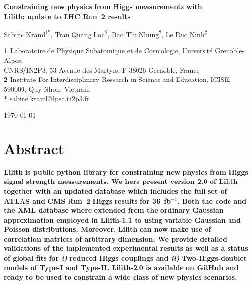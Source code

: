 \documentclass[submission, Phys]{SciPost}
\begin{document}
\begin{center}{\Large \textbf{
  Constraining new physics from Higgs measurements with\\[1mm] Lilith: update to LHC Run~2 results}}\end{center}

\begin{center}
Sabine Kraml\textsuperscript{1*},
Tran Quang Loc\textsuperscript{2},
Dao Thi Nhung\textsuperscript{2},
Le Duc Ninh\textsuperscript{2}
\end{center}

\begin{center}
{\bf 1} Laboratoire de Physique Subatomique et de Cosmologie, Universit\'e Grenoble-Alpes,\\ CNRS/IN2P3, 53 Avenue des Martyrs, F-38026 Grenoble, France\\
{\bf 2} Institute For Interdisciplinary Research in Science and Education, ICISE,\\ 590000, Quy Nhon, Vietnam\\
* sabine.kraml@lpsc.in2p3.fr
\end{center}

\begin{center}
\today
\end{center}


\section*{Abstract}
{\bf
Lilith is public python library for constraining new physics from Higgs signal strength measurements. 
We here present version 2.0 of Lilith together with an updated database which includes the full set 
of ATLAS and CMS Run~2 Higgs results for 36~fb$^{-1}$.  
Both the code and the XML database where extended from the ordinary Gaussian approximation employed in 
Lilith-1.1 to using variable Gaussian and Poisson distributions.  Moreover, Lilith can now make use of correlation 
matrices  of arbitrary dimension. 
We provide detailed validations of the implemented experimental results as well as 
a status of global fits for {\it i)} reduced Higgs couplings and {\it ii)} Two-Higgs-doublet models of Type-I and Type-II. 
Lilith-2.0 is available on GitHub and ready to be used to constrain a wide class of new physics scenarios.}
\end{document}
